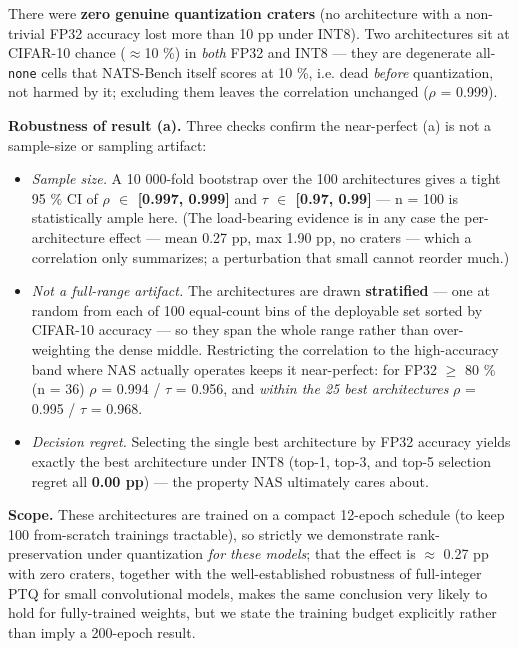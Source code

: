 \documentclass[11pt]{article}
\begin{document}
There were \textbf{zero genuine quantization craters} (no architecture with a non-trivial FP32 accuracy lost more than 10 pp under INT8). Two architectures sit at CIFAR-10 chance ($\approx$10 \%) in \textit{both} FP32 and INT8 --- they are degenerate all-\texttt{none} cells that NATS-Bench itself scores at 10 \%, i.e. dead \textit{before} quantization, not harmed by it; excluding them leaves the correlation unchanged ($\rho$ = 0.999).


\textbf{Robustness of result (a).} Three checks confirm the near-perfect (a) is not a sample-size or sampling artifact:


\begin{itemize}\setlength{\itemsep}{2pt}
\item \textit{Sample size.} A 10 000-fold bootstrap over the 100 architectures gives a tight 95 \% CI of \textbf{$\rho$ $\in$ [0.997, 0.999]} and \textbf{$\tau$ $\in$ [0.97, 0.99]} --- n = 100 is statistically ample here. (The load-bearing evidence is in any case the per-architecture effect --- mean 0.27 pp, max 1.90 pp, no craters --- which a correlation only summarizes; a perturbation that small cannot reorder much.)
\item \textit{Not a full-range artifact.} The architectures are drawn \textbf{stratified} --- one at random from each of 100 equal-count bins of the deployable set sorted by CIFAR-10 accuracy --- so they span the whole range rather than over-weighting the dense middle. Restricting the correlation to the high-accuracy band where NAS actually operates keeps it near-perfect: for FP32 $\ge$ 80 \% (n = 36) $\rho$ = 0.994 / $\tau$ = 0.956, and \textit{within the 25 best architectures} $\rho$ = 0.995 / $\tau$ = 0.968.
\item \textit{Decision regret.} Selecting the single best architecture by FP32 accuracy yields exactly the best architecture under INT8 (top-1, top-3, and top-5 selection regret all \textbf{0.00 pp}) --- the property NAS ultimately cares about.
\end{itemize}



\textbf{Scope.} These architectures are trained on a compact 12-epoch schedule (to keep 100 from-scratch trainings tractable), so strictly we demonstrate rank-preservation under quantization \textit{for these models}; that the effect is $\approx$ 0.27 pp with zero craters, together with the well-established robustness of full-integer PTQ for small convolutional models, makes the same conclusion very likely to hold for fully-trained weights, but we state the training budget explicitly rather than imply a 200-epoch result.
\end{document}
